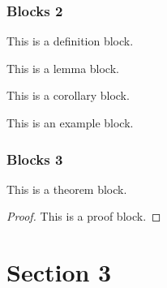 \documentclass[compress,aspectratio=43]{beamer}
\begin{document}
\begin{frame}
    \frametitle{Blocks 2}
    \begin{definition}[XXX]
        This is a definition block.
    \end{definition}

    \begin{lemma}[XXX]
        This is a lemma block.
    \end{lemma}

    \begin{corollary}[XXX]
        This is a corollary block.
    \end{corollary}

    \begin{example}[XXX]
        This is an example block.
    \end{example}

\end{frame}

\begin{frame}
    \frametitle{Blocks 3}
    \begin{theorem}[XXX]
        This is a theorem block.
    \end{theorem}

    \begin{proof}
        This is a proof block.
    \end{proof}

\end{frame}



\section{Section 3}
\end{document}

